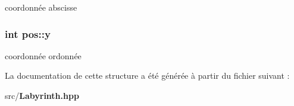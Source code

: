 coordonnée abscisse 

\subsubsection[{y}]{\setlength{\rightskip}{0pt plus 5cm}int pos\-::y}\label{structpos_a8507e8245423d67f3bb29e2fa0f08054}


coordonnée ordonnée 



La documentation de cette structure a été générée à partir du fichier suivant \-:\begin{DoxyCompactItemize}
\item 
src/{\bf Labyrinth.\-hpp}\end{DoxyCompactItemize}
